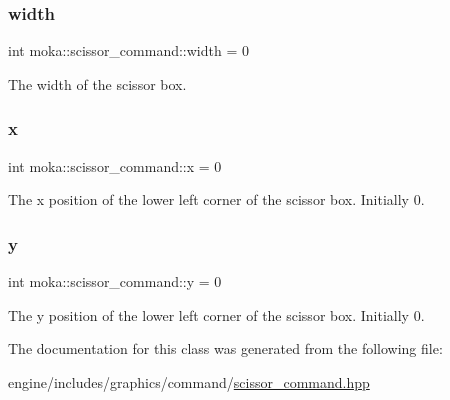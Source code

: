 \subsubsection{\texorpdfstring{width}{width}}
{\footnotesize\ttfamily int moka\+::scissor\+\_\+command\+::width = 0}

The width of the scissor box. \mbox{\label{classmoka_1_1scissor__command_a81d94c0a6c2c3cfd0e1719d44c9eeb0b}} 
\subsubsection{\texorpdfstring{x}{x}}
{\footnotesize\ttfamily int moka\+::scissor\+\_\+command\+::x = 0}

The x position of the lower left corner of the scissor box. Initially 0. \mbox{\label{classmoka_1_1scissor__command_a550da319eb32d86afbd60a72c0f30532}} 
\subsubsection{\texorpdfstring{y}{y}}
{\footnotesize\ttfamily int moka\+::scissor\+\_\+command\+::y = 0}

The y position of the lower left corner of the scissor box. Initially 0. 

The documentation for this class was generated from the following file\+:\begin{DoxyCompactItemize}
\item 
engine/includes/graphics/command/\mbox{\hyperlink{scissor__command_8hpp}{scissor\+\_\+command.\+hpp}}\end{DoxyCompactItemize}
